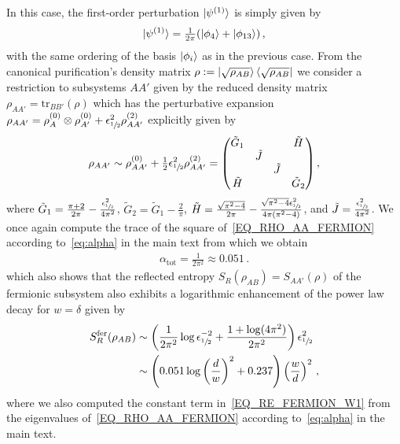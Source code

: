 \documentclass[prl,a4paper,notitlepage,twocolumn,superscriptaddress,longbibliography,reprint]{revtex4-2}
\begin{document}
In this case, the first-order perturbation $\ket{\psi^{(1)}}$ is simply given by
\begin{align}\label{EQ_PSI1_FERMION}
    \ket{\psi^{(1)}}=\tfrac{1}{2\pi}(\ket{\phi_{4}}+\ket{\phi_{13}}) \, ,
\end{align}
with the same ordering of the basis $\ket{\phi_{i}}$ as in the previous case. From the canonical purification's density matrix $\rho:=\ket{\sqrt{\rho_{AB}}}\bra{\sqrt{\rho_{AB}}}$ we consider a restriction to subsystems $AA'$ given by the reduced density matrix $\rho_{AA'}=\textrm{tr}_{BB'}(\rho)$ which has the perturbative expansion $\rho_{AA'}=\rho^{(0)}_{A}\otimes\rho^{(0)}_{A'}+\epsilon^{2}_{\sfrac{1}{2}}\rho^{(2)}_{AA'}$ explicitly given by
\begin{align}
\label{EQ_RHO_AA_FERMION}
   \rho_{AA'} \sim \rho^{(0)}_{AA'}+\tfrac{1}{2}\epsilon^{2}_{\sfrac{1}{2}}\rho^{(2)}_{AA'}=
   \begin{pmatrix}
  \tilde{G}_{1} &  &  & \tilde{H} \\
  & \tilde{J} &  & \\
  &  &   \tilde{J}&  \\
 \tilde{H} &  &  & \tilde{G}_{2}
    \end{pmatrix} ,
\end{align}
where $\tilde{G}_{1}=\frac{\pi+2}{2\pi}-\frac{\epsilon^{2}_{\sfrac{1}{2}}}{4\pi^{2}}$, $\tilde{G}_{2}=\tilde{G}_{1}-\frac{2}{\pi}$, $\tilde{H}=\frac{\sqrt{\pi^{2}-4}}{2\pi}-\frac{\sqrt{\pi^{2}-4}\epsilon^{2}_{\sfrac{1}{2}}}{4\pi(\pi^{2}-4)}$, and $\tilde{J}=\frac{\epsilon^{2}_{\sfrac{1}{2}}}{4\pi^{2}}$. We once again compute the trace of the square of~\eqref{EQ_RHO_AA_FERMION} according to~\eqref{eq:alpha} in the main text from which we obtain
\begin{align}\label{EQ_APLHA_TOT_RE_FERMION}
    \alpha_{\mathrm{tot}}=\frac{1}{2\pi^{2}}\approx 0.051 \, .
\end{align}
which also shows that the reflected entropy $S_{R}(\rho_{AB})=S_{AA'}(\rho)$ of the fermionic subsystem also exhibits a logarithmic enhancement of the power law decay for $w=\delta$ given by
\begin{align}\label{EQ_RE_FERMION_W1}
    S_{R}^\text{fer}(\rho_{AB}) &\sim 
    \left( \frac{1}{2\pi^{2}} \log\epsilon_{\sfrac{1}{2}}^{-2} + \frac{1 + \log(4\pi^2)}{2\pi^2} \right) \epsilon_{\sfrac{1}{2}}^2 \nonumber  \\
    & \sim\left(0.051\log\left(\frac{d}{w}\right)^2+0.237\right) \left(\frac{w}{d}\right)^{2}\, ,
\end{align}
where we also computed the constant term in~\eqref{EQ_RE_FERMION_W1} from the eigenvalues of~\eqref{EQ_RHO_AA_FERMION} according to~\eqref{eq:alpha} in the main text.
\end{document}
